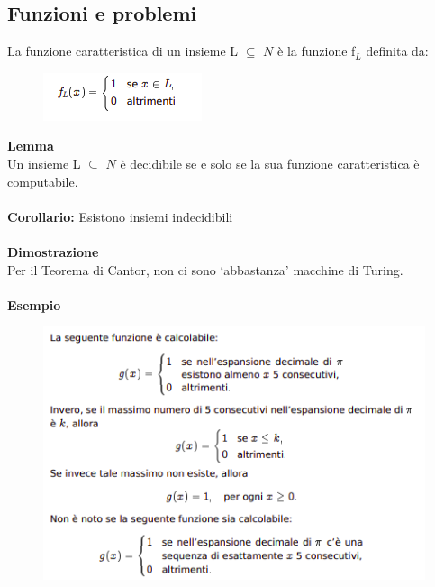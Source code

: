 \subsection{Funzioni e problemi}
La funzione caratteristica di un insieme L $\subseteq$ $N$ è la funzione f$_L$ definita da:
\begin{figure}[htp]
    \centering
    \includegraphics[scale=0.9]{tesi_stile/img/funzione.png}
\end{figure}
\textbf{Lemma}\\
Un insieme L $\subseteq$ $N$ è decidibile se e solo se la sua funzione caratteristica è computabile.\\\\
\textbf{Corollario:} Esistono insiemi indecidibili\\\\
\textbf{Dimostrazione}\\
Per il Teorema di Cantor, non ci sono ‘abbastanza’ macchine di Turing.\\\\
\textbf{Esempio}
\begin{figure}[htp]
    \includegraphics[scale=1]{tesi_stile/img/es-cantor.png}
\end{figure}